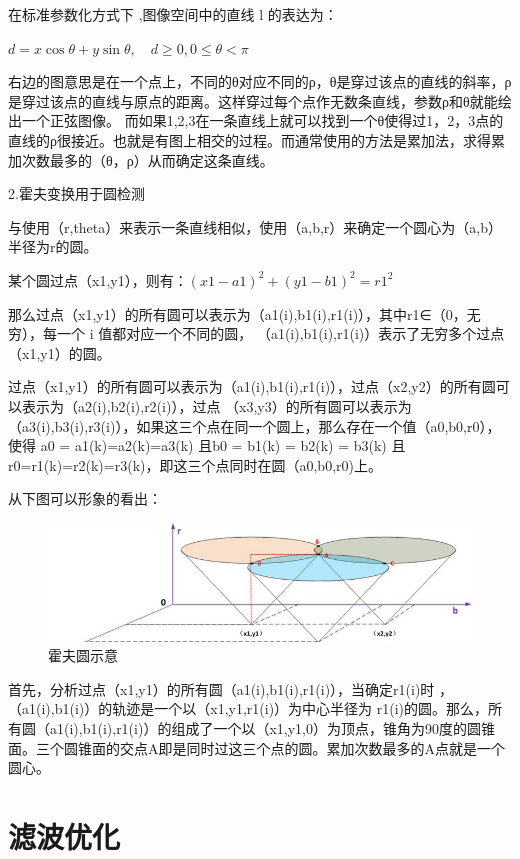在标准参数化方式下 ,图像空间中的直线 l 的表达为：

$d=x \cos \theta+y \sin \theta, \quad d \geqslant 0,0 \leqslant \theta<\pi$

右边的图意思是在一个点上，不同的θ对应不同的ρ，θ是穿过该点的直线的斜率，ρ是穿过该点的直线与原点的距离。这样穿过每个点作无数条直线，参数ρ和θ就能绘出一个正弦图像。 ⽽如果1,2,3在一条直线上就可以找到⼀个θ使得过1，2，3点的直线的ρ很接近。也就是有图上相交的过程。而通常使用的方法是累加法，求得累加次数最多的（θ，ρ）从⽽确定这条直线。

2.霍夫变换用于圆检测

与使用（r,theta）来表示一条直线相似，使用（a,b,r）来确定一个圆心为（a,b）半径为r的圆。

某个圆过点（x1,y1），则有：$(x1-a1)^2 + (y1-b1)^2 = r1^2$

那么过点（x1,y1）的所有圆可以表示为（a1(i),b1(i),r1(i)），其中r1∈（0，无穷），每⼀个 i 值都对应⼀个不同的圆， （a1(i),b1(i),r1(i)）表⽰了无穷多个过点（x1,y1）的圆。

过点（x1,y1）的所有圆可以表示为（a1(i),b1(i),r1(i)），过点（x2,y2）的所有圆可以表示为（a2(i),b2(i),r2(i)），过点 （x3,y3）的所有圆可以表⽰为（a3(i),b3(i),r3(i)），如果这三个点在同一个圆上，那么存在一个值（a0,b0,r0），使得 a0 = a1(k)=a2(k)=a3(k) 且b0 = b1(k) = b2(k) = b3(k) 且r0=r1(k)=r2(k)=r3(k)，即这三个点同时在圆（a0,b0,r0)上。

从下图可以形象的看出：

\begin{figure}[ht]
  \centering
  \includegraphics[width=0.8\linewidth]{./Figure/Hough_Circle.png}
  \caption{霍夫圆示意}\label{Fig:xd1}
\end{figure}

⾸先，分析过点（x1,y1）的所有圆（a1(i),b1(i),r1(i)），当确定r1(i)时 ，（a1(i),b1(i)）的轨迹是⼀个以（x1,y1,r1(i)）为中心半径为 r1(i)的圆。那么，所有圆（a1(i),b1(i),r1(i)）的组成了一个以（x1,y1,0）为顶点，锥角为90度的圆锥面。三个圆锥面的交点A即是同时过这三个点的圆。累加次数最多的A点就是一个圆⼼。

\section{滤波优化}

